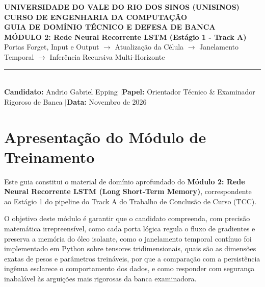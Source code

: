 \documentclass[11pt,a4paper]{article}
\begin{document}
\begin{center}
  {\large\textbf{\textsf{UNIVERSIDADE DO VALE DO RIO DOS SINOS (UNISINOS)}}}\\[0.2cm]
  {\normalsize\textbf{\textsf{CURSO DE ENGENHARIA DA COMPUTAÇÃO}}}\\[0.4cm]
  {\LARGE\textbf{\textcolor{NavyBlue}{\textsf{GUIA DE DOMÍNIO TÉCNICO E DEFESA DE BANCA}}}}\\[0.2cm]
  {\Large\textbf{\textsf{MÓDULO 2: Rede Neural Recorrente LSTM (Estágio 1 - Track A)}}}\\[0.2cm]
  {\normalsize\textsf{Portas Forget, Input e Output $\longrightarrow$ Atualização da Célula $\longrightarrow$ Janelamento Temporal $\longrightarrow$ Inferência Recursiva Multi-Horizonte}}\\[0.4cm]
  \rule{\textwidth}{1pt}\\[0.2cm]
  \small\textbf{Candidato:} Andrio Gabriel Epping \quad$|$\quad \textbf{Papel:} Orientador Técnico \& Examinador Rigoroso de Banca \quad$|$\quad \textbf{Data:} Novembro de 2026
\end{center}
\vspace{0.3cm}

\section*{Apresentação do Módulo de Treinamento}
Este guia constitui o material de domínio aprofundado do \textbf{Módulo 2: Rede Neural Recorrente LSTM (Long Short-Term Memory)}, correspondente ao Estágio 1 do pipeline do Track A do Trabalho de Conclusão de Curso (TCC).

O objetivo deste módulo é garantir que o candidato compreenda, com precisão matemática irrepreensível, como cada porta lógica regula o fluxo de gradientes e preserva a memória do óleo isolante, como o janelamento temporal contínuo foi implementado em Python sobre tensores tridimensionais, quais são as dimensões exatas de pesos e parâmetros treináveis, por que a comparação com a persistência ingênua esclarece o comportamento dos dados, e como responder com segurança inabalável às arguições mais rigorosas da banca examinadora.
\end{document}
